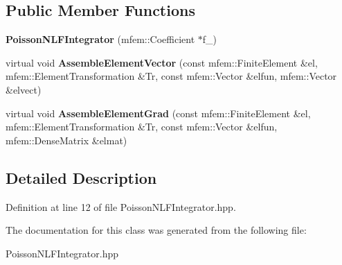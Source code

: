 \subsection*{Public Member Functions}
\begin{DoxyCompactItemize}
\item 
\mbox{\label{classPoissonNLFIntegrator_aa3d3621d2ad439cab3bdc2aac1fc2f77}} 
{\bfseries Poisson\+N\+L\+F\+Integrator} (mfem\+::\+Coefficient $\ast$f\+\_\+)
\item 
\mbox{\label{classPoissonNLFIntegrator_a291e6cffc7f2719257107dc594b22a40}} 
virtual void {\bfseries Assemble\+Element\+Vector} (const mfem\+::\+Finite\+Element \&el, mfem\+::\+Element\+Transformation \&Tr, const mfem\+::\+Vector \&elfun, mfem\+::\+Vector \&elvect)
\item 
\mbox{\label{classPoissonNLFIntegrator_a577291e8fc10dddceb98a21589ab9a88}} 
virtual void {\bfseries Assemble\+Element\+Grad} (const mfem\+::\+Finite\+Element \&el, mfem\+::\+Element\+Transformation \&Tr, const mfem\+::\+Vector \&elfun, mfem\+::\+Dense\+Matrix \&elmat)
\end{DoxyCompactItemize}


\subsection{Detailed Description}


Definition at line 12 of file Poisson\+N\+L\+F\+Integrator.\+hpp.



The documentation for this class was generated from the following file\+:\begin{DoxyCompactItemize}
\item 
Poisson\+N\+L\+F\+Integrator.\+hpp\end{DoxyCompactItemize}
